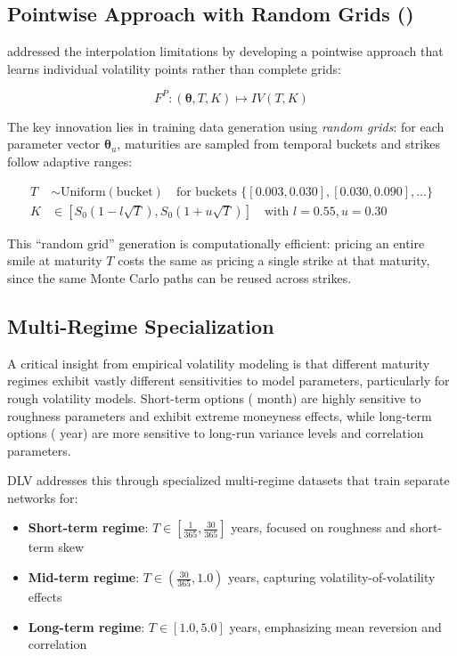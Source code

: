 	\subsection{Pointwise Approach with Random Grids (\citet{Baschetti2024DeepCalibrationRandomGrids})}\label{subsec:pointwise_approach}
	
	\citet{Baschetti2024DeepCalibrationRandomGrids} addressed the interpolation limitations by developing a pointwise approach that learns individual volatility points rather than complete grids:
	
	\begin{equation}
		F^P: (\boldsymbol{\theta}, T, K) \mapsto IV(T, K)
	\end{equation}
	
	The key innovation lies in training data generation using \emph{random grids}: for each parameter vector $\boldsymbol{\theta}_u$, maturities are sampled from temporal buckets and strikes follow adaptive ranges:
	
	\begin{align}
		T &\sim \text{Uniform}(\text{bucket}) \quad \text{for buckets } \{[0.003, 0.030], [0.030, 0.090], \ldots\} \\
		K &\in [S_0(1 - l\sqrt{T}), S_0(1 + u\sqrt{T})] \quad \text{with } l = 0.55, u = 0.30
	\end{align}
	
	This ``random grid'' generation is computationally efficient: pricing an entire smile at maturity $T$ costs the same as pricing a single strike at that maturity, since the same Monte Carlo paths can be reused across strikes.
	
	\subsection{Multi-Regime Specialization}\label{subsec:multi_regime}
	
	A critical insight from empirical volatility modeling is that different maturity regimes exhibit vastly different sensitivities to model parameters, particularly for rough volatility models. Short-term options ( month) are highly sensitive to roughness parameters and exhibit extreme moneyness effects, while long-term options ( year) are more sensitive to long-run variance levels and correlation parameters.
	
	DLV addresses this through specialized multi-regime datasets that train separate networks for:
	\begin{itemize}[nosep]
		\item \textbf{Short-term regime}: $T \in [\frac{1}{365}, \frac{30}{365}]$ years, focused on roughness and short-term skew
		\item \textbf{Mid-term regime}: $T \in (\frac{30}{365}, 1.0)$ years, capturing volatility-of-volatility effects  
		\item \textbf{Long-term regime}: $T \in [1.0, 5.0]$ years, emphasizing mean reversion and correlation
	\end{itemize}
	
